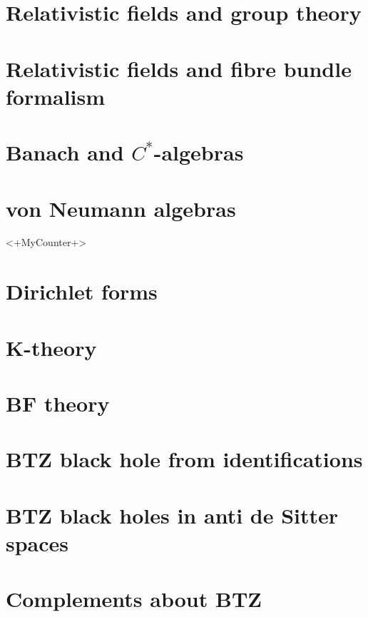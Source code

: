 \chapter{Relativistic fields and group theory}


\chapter{Relativistic fields and fibre bundle formalism}


\chapter{Banach and \texorpdfstring{$C^*$}{C*}-algebras}
   

\chapter{von Neumann algebras}<+MyCounter+>


\chapter{Dirichlet forms}


\chapter{K-theory}


\chapter{BF theory}


\chapter{BTZ black hole from identifications}



\chapter{BTZ black holes in anti de Sitter spaces}                  \label{ChapBHinAdS}
%
%

    \label{ChapAdS}     %


\chapter{Complements about BTZ}



